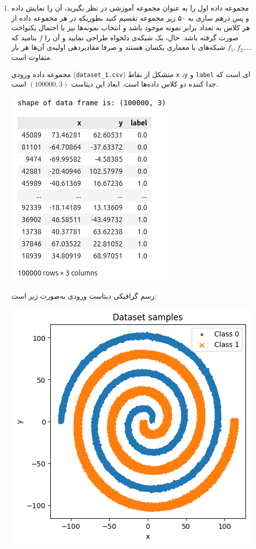 \begin{enumerate}
	\item
مجموعه داده اول را به عنوان مجموعه آموزشی در نظر بگیرید، آن را نمایش داده و پس درهم سازی به ۵۰ زیر مجموعه تقسیم کنید بطوریکه در هر مجموعه داده از هر کلاس به تعداد برابر نمونه موجود باشد و انتخاب نمونه‌ها نیز با احتمال یکنواخت صورت گرفته باشد. حال، یک شبکه‌ی  دلخواه طراحی نمایید و آن را $f$ بنامید که $f_1, f_2, \ldots$ شبکه‌های  با معماری یکسان هستند و صرفا مقادیردهی اولیه‌ی آن‌ها هر بار متفاوت است.
	
	\begin{qsolve}
مجموعه داده ورودی (\texttt{dataset\_1.csv}) متشکل از نقاط \texttt{x} ،\texttt{y} و \texttt{label} ای است که جدا کننده دو کلاس داده‌ها است. ابعاد این دیتاست $(100000, 3)$ است.
	\end{qsolve}
	
	
	
	\begin{qsolve}
	
		\begin{center}
			\includegraphics*[width=0.4\linewidth]{pics/img1.png}
			\label{خروجی دیتاست ۱}
		\end{center}
		
		رسم گرافیکی دیتاست ورودی به‌صورت زیر است:
		
		\begin{center}
			\includegraphics*[width=0.5\linewidth]{pics/img2.png}
			\label{دیتاست ۱}
		\end{center}
		

\end{qsolve}
\end{enumerate}
